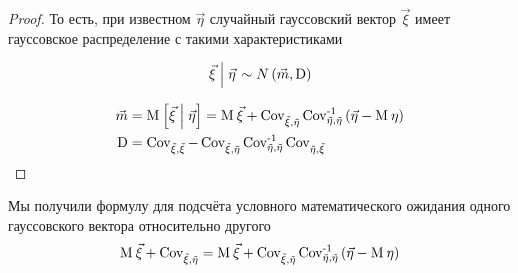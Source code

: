\begin{proof}
    То есть, при известном $\vec{\eta}$ случайный гауссовский вектор
    $\vec{\xi}$ имеет гауссовское распределение с такими характеристиками

    $$\left. \vec{\xi} \mcond \vec{\eta} \right. \sim N\left( \vec{m},
        \operatorname{D} \right)$$
    
    \begin{align*}
    \vec{m}
        &= \Mean{\vec{\xi} \mcond \vec{\eta}}
        = \mean{\vec{\xi}} + \Cov{\vec{\xi}}{\vec{\eta}}
            \dCov[-1]{\vec{\eta}}\left( \vec{\eta} - \mean{\eta} \right) \\
    \operatorname{D}
        &= \dCov{\vec{\xi}} - \Cov{\vec{\xi}}{\vec{\eta}} \dCov[-1]{\vec{\eta}}
            \Cov{\vec{\eta}}{\vec{\xi}}
    \end{align*}
\end{proof}

\begin{remark}
    Мы получили формулу для подсчёта условного математического ожидания одного
    гауссовского вектора относительно другого
    \begin{align*}
    \mean{\vec{\xi}} + \Cov{\vec{\xi}}{\vec{\eta}}
    = \mean{\vec{\xi}} + \Cov{\vec{\xi}}{\vec{\eta}}
            \dCov[-1]{\vec{\eta}}\left( \vec{\eta} - \mean{\eta} \right)
    \end{align*}
\end{remark}
